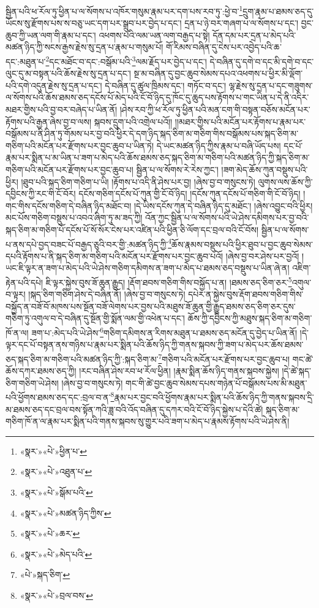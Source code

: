 སྦྱིན་པའི་ཕ་རོལ་ཏུ་ཕྱིན་པ་ལ་སོགས་པ་འཁོར་གསུམ་རྣམ་པར་དག་པས་རབ་ཏུ་:ཕྱེ་བ་\footnote{«སྣར་»«པེ་»ཕྱིན་པ་}དྲུག་རྣམ་པ་ཐམས་ཅད་དུ་ཡོངས་སུ་རྫོགས་པས་ས་བཅུ་ཡང་དག་པར་སྒྲུབ་པར་བྱེད་པ་དང་། དྲན་པ་ཉེ་བར་གཞག་པ་ལ་སོགས་པ་དང་། བྱང་ཆུབ་ཀྱི་ཡན་ལག་གི་རྣམ་པ་དང་། འཕགས་པའི་ལམ་ཡན་ལག་བརྒྱད་པ་སྟེ། དོན་དམ་པར་དྲན་པ་མེད་པའི་མཚན་ཉིད་ཀྱི་སངས་རྒྱས་རྗེས་སུ་དྲན་པ་རྣམ་པ་གསུམ་པོ། གོ་རིམས་བཞིན་དུ་ངེས་པར་འབྱེད་པའི་ཆ་དང་:མཐུན་པ་\footnote{«སྣར་»«པེ་»འཐུན་པ་}དང་མཐོང་བ་དང་:བསྒོམ་པའི་\footnote{«སྣར་»«པེ་»སྒོམ་པའི་}ལམ་རྗོད་པར་བྱེད་པ་དང་། དེ་བཞིན་དུ་དགེ་བ་དང་མི་དགེ་བ་དང་ལུང་དུ་མ་བསྟན་པའི་ཆོས་རྗེས་སུ་དྲན་པ་དང་། སྔ་མ་བཞིན་དུ་བྱང་ཆུབ་སེམས་དཔའ་འཕགས་པ་ཕྱིར་མི་ལྡོག་པའི་དགེ་འདུན་རྗེས་སུ་དྲན་པ་དང་། དེ་བཞིན་དུ་ཚུལ་ཁྲིམས་དང་། གཏོང་བ་དང་། ལྷ་རྗེས་སུ་དྲན་པ་དང་གཟུགས་ལ་སོགས་པའི་ཆོས་ཐམས་ཅད་དངོས་པོ་མེད་པའི་ངོ་བོ་ཉིད་དུ་ཁོང་དུ་ཆུད་པས་རྟོགས་པ་གང་ཡིན་པ་དེ་ནི་འདིར་མཐར་གྱིས་པའི་བྱ་བར་བཞེད་པ་ཡིན་ནོ། །ཤེས་རབ་ཀྱི་ཕ་རོལ་ཏུ་ཕྱིན་པའི་མན་ངག་གི་བསྟན་བཅོས་མངོན་པར་རྟོགས་པའི་རྒྱན་ཞེས་བྱ་བ་ལས། སྐབས་དྲུག་པའི་འགྲེལ་པའོ།། །།མཐར་གྱིས་པའི་མངོན་པར་རྟོགས་པ་རྣམ་པར་བསྒོམས་པ་ནི་ཤིན་ཏུ་གོམས་པར་བྱ་བའི་ཕྱིར་དེ་དག་ཉིད་སྐད་ཅིག་མ་གཅིག་གིས་བསྒོམས་པས་སྐད་ཅིག་མ་གཅིག་པའི་མངོན་པར་རྫོགས་པར་བྱང་ཆུབ་པ་ཡིན་ཏེ། དེ་ཡང་མཚན་ཉིད་ཀྱིས་རྣམ་པ་བཞི་ཡོད་པས། དང་པོ་རྣམ་པར་སྨིན་པ་མ་ཡིན་པ་ཟག་པ་མེད་པའི་ཆོས་ཐམས་ཅད་སྐད་ཅིག་མ་གཅིག་པའི་མཚན་ཉིད་ཀྱི་སྐད་ཅིག་མ་གཅིག་པའི་མངོན་པར་རྫོགས་པར་བྱང་ཆུབ་པ། སྦྱིན་པ་ལ་སོགས་རེ་རེས་ཀྱང་། །ཟག་མེད་ཆོས་ཀུན་བསྡུས་པའི་ཕྱིར། །ཐུབ་པའི་སྐད་ཅིག་གཅིག་པ་ཡི། །རྟོགས་པ་འདི་ནི་ཤེས་པར་བྱ། །ཞེས་བྱ་བ་གསུངས་ཏེ། ལུགས་ལས་ཆོས་ཀྱི་དབྱིངས་ཀྱི་རང་གི་ངོ་བོར། དངོས་གཅིག་དངོས་པོ་ཀུན་གྱི་ངོ་བོ་ཉིད། །དངོས་ཀུན་དངོས་པོ་གཅིག་གི་ངོ་བོ་ཉིད། །གང་གིས་དངོས་གཅིག་དེ་བཞིན་ཉིད་མཐོང་བ། །དེ་ཡིས་དངོས་ཀུན་དེ་བཞིན་ཉིད་དུ་མཐོང་། །ཞེས་འབྱུང་བའི་ཕྱིར། མང་པོས་གཅིག་བསྡུས་པ་འབའ་ཞིག་ཏུ་མ་ཟད་ཀྱི། འོན་ཀྱང་སྦྱིན་པ་ལ་སོགས་པའི་ཡེ་ཤེས་དམིགས་པར་བྱ་བའི་སྐད་ཅིག་མ་གཅིག་པོ་དངོས་པོ་སོ་སོར་ངེས་པར་འཛིན་པའི་ཕྱིན་ཅི་ལོག་དང་བྲལ་བའི་ངོ་བོས། སྦྱིན་པ་ལ་སོགས་པ་ནས་དཔེ་བྱད་བཟང་པོ་བརྒྱད་ཅུའི་བར་གྱི་:མཚན་ཉིད་ཀྱི་\footnote{«སྣར་»«པེ་»མཚན་ཉིད་ཀྱིས་}ཆོས་རྣམས་བསྡུས་པའི་ཕྱིར་ཐུབ་པ་བྱང་ཆུབ་སེམས་དཔའི་རྟོགས་པ་ནི་སྐད་ཅིག་མ་གཅིག་པའི་མངོན་པར་རྫོགས་པར་བྱང་ཆུབ་པའོ། །ཞེས་བྱ་བར་ཤེས་པར་བྱའོ། །ཡང་ཇི་ལྟར་ན་ཟག་པ་མེད་པའི་ཡེ་ཤེས་གཅིག་དམིགས་ན་ཟག་པ་མེད་པ་ཐམས་ཅད་བསྡུས་པ་ཡིན་ཞེ་ན། འཇིག་རྟེན་པའི་དཔེ། ཇི་ལྟར་སྐྱེས་བུས་ཟོ་ཆུན་རྒྱུད། །རྡོག་ཐབས་གཅིག་གིས་བསྐྱོད་པ་ན། །ཐམས་ཅད་ཅིག་ཅར་\footnote{«སྣར་»«པེ་»ཆར་}འགུལ་བ་ལྟར། །སྐད་ཅིག་གཅིག་ཤེས་དེ་བཞིན་ནོ། །ཞེས་བྱ་བ་གསུངས་ཏེ། དཔེར་ན་སྐྱེས་བུས་རྡོག་ཐབས་གཅིག་གིས་བསྐྱོད་ན་བཟོ་བོ་མཁས་པས་སྔོན་བཟོ་ལེགས་པར་བྱས་པའི་མཐུས་ཟོ་ཆུན་གྱི་རྒྱུད་ཐམས་ཅད་ཅིག་ཅར་དུས་གཅིག་ཏུ་འགུལ་བ་དེ་བཞིན་དུ་སྔོན་གྱི་སྨོན་ལམ་གྱི་འཕེན་པ་དང་། ཆོས་ཀྱི་དབྱིངས་ཀྱི་མཐུས་སྐད་ཅིག་མ་གཅིག་ཁོ་ན་ལ། ཟག་པ་:མེད་པའི་ཡེ་ཤེས་\footnote{«སྣར་»«པེ་»མེད་པའི་}གཅིག་དམིགས་ན་རིགས་མཐུན་པ་ཐམས་ཅད་མངོན་དུ་བྱེད་པ་ཡིན་ནོ། །དེ་ལྟར་དང་པོ་བསྟན་ནས་གཉིས་པ་རྣམ་པར་སྨིན་པའི་ཆོས་ཉིད་ཀྱི་གནས་སྐབས་ཀྱི་ཟག་པ་མེད་པར་ཆོས་ཐམས་ཅད་སྐད་ཅིག་མ་གཅིག་པའི་མཚན་ཉིད་ཀྱི་:སྐད་ཅིག་མ་\footnote{«པེ་»སྐད་ཅིག་}གཅིག་པའི་མངོན་པར་རྫོགས་པར་བྱང་ཆུབ་པ། གང་ཚེ་ཆོས་དཀར་ཐམས་ཅད་ཀྱི། །རང་བཞིན་ཤེས་རབ་ཕ་རོལ་ཕྱིན། །རྣམ་སྨིན་ཆོས་ཉིད་གནས་སྐབས་སྐྱེས། །དེ་ཚེ་སྐད་ཅིག་གཅིག་ཡེ་ཤེས། །ཞེས་བྱ་བ་གསུངས་ཏེ། གང་གི་ཚེ་བྱང་ཆུབ་སེམས་དཔས་གཉེན་པོ་བསྒོམས་པས་མི་མཐུན་པའི་ཕྱོགས་ཐམས་ཅད་དང་:བྲལ་བ་ན་\footnote{«སྣར་»«པེ་»བྲལ་བས་}རྣམ་པར་བྱང་བའི་ཕྱོགས་རྣམ་པར་སྨིན་པའི་ཆོས་ཉིད་ཀྱི་གནས་སྐབས་དྲི་མ་ཐམས་ཅད་དང་བྲལ་བས་སྟོན་ཀའི་ཟླ་བའི་འོད་བཞིན་དུ་དཀར་བའི་ངོ་བོ་ཉིད་སྐྱེས་པ་དེའི་ཚེ། སྐད་ཅིག་མ་གཅིག་ཁོ་ན་ལ་རྣམ་པར་སྨིན་པའི་གནས་སྐབས་སུ་གྱུར་པའི་ཟག་པ་མེད་པ་རྣམས་རྟོགས་པའི་ཡེ་ཤེས་ནི། 